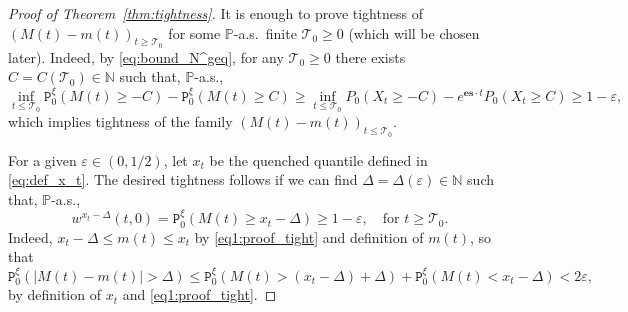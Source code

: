 \documentclass[12pt,reqno,oneside]{amsart}
\numberwithin{equation}{section}
\theoremstyle{definition}
\theoremstyle{remark}
\newcommand{\N}{\mathbb{N}}
\newcommand{\PP}{\mathbb{P}}
\newcommand{\es}{\mathbf{es}}
\begin{document}
\begin{proof}[Proof of Theorem~\ref{thm:tightness}]
  It is enough to prove tightness of $(M(t)-m(t))_{t \geq \mathcal{T}_0}$ for
  some $\PP$-a.s.~finite $\mathcal{T}_0\geq0$ (which will be
      chosen later). Indeed, by \eqref{eq:bound_N^geq}, for any
  $\mathcal{T}_0\geq0$ there exists $C=C(\mathcal{T}_0) \in \N$ such that,
  $\PP$-a.s.,
  \begin{equation*}
    \inf_{t \leq \mathcal{T}_0} \mathtt{P}_0^\xi(M(t) \geq -C)
    - \mathtt{P}_0^\xi(M(t) \geq C)
    \geq \inf_{t \leq \mathcal{T}_0} P_0(X_{t}\geq -C) -e^{\es\cdot t}P_0(X_{t} \geq C)
    \geq 1-\varepsilon,
  \end{equation*}
  which implies tightness of  the family $(M(t)-m(t))_{t \leq \mathcal{T}_0}$.

  For a given $\varepsilon \in (0,1/2)$, let $x_t$ be the quenched quantile
  defined in \eqref{eq:def_x_t}. The desired tightness follows if we can find
  $\Delta=\Delta(\varepsilon)\in \N$ such that, $\PP$-a.s.,
  \begin{equation}
    \label{eq1:proof_tight}
    w^{x_t-\Delta}(t,0)= \mathtt{P}^\xi_0(M(t) \geq x_t - \Delta)
    \geq 1-\varepsilon, \quad \text{for } t \geq \mathcal{T}_0.
  \end{equation}
  Indeed, $x_t- \Delta \leq m(t) \leq x_t$ by \eqref{eq1:proof_tight} and definition of $m(t)$,
  so that
  \begin{equation*}
    \mathtt{P}^\xi_0(|M(t)-m(t)| > \Delta)
    \leq \mathtt{P}^\xi_0(M(t) > (x_t- \Delta) +  \Delta)
    + \mathtt{P}^\xi_0(M(t) < x_t- \Delta) < 2\varepsilon,
  \end{equation*}
  by definition of $x_t$ and \eqref{eq1:proof_tight}.


\end{proof}
\end{document}

